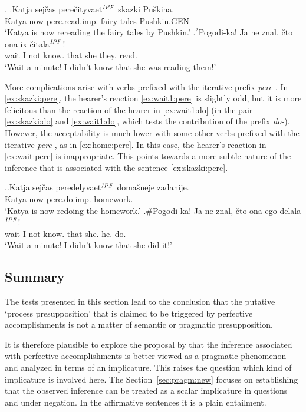 \ex. \label{ex:skazki:pere}\ag.\label{ex:skazki:pere1}Katja sej\v{c}as pere\v{c}ityvaet$^{\mathit{IPF}}$ skazki Pu\v{s}kina.\\
Katya now pere.read.imp. {fairy tales} Pushkin.{\tiny GEN}\\
`Katya is now rereading the fairy tales by Pushkin.'
\bg.$^?$Pogodi-ka! Ja ne znal, \v{c}to ona ix \v{c}itala$^{\mathit{IPF}}$!\label{ex:wait1:pere}\\
wait I not know. that she they. read.\\
`Wait a minute! I didn't know that she was reading them!'

More complications arise with verbs prefixed with the iterative prefix \textit{pere-}. In \ref{ex:skazki:pere}, the hearer's reaction \ref{ex:wait1:pere} is slightly odd, but it is more felicitous than the reaction of the hearer in \ref{ex:wait1:do} (in the pair \ref{ex:skazki:do} and \ref{ex:wait1:do}, which tests the contribution of the prefix \textit{do-}). However, the acceptability is much lower with some other verbs prefixed with the iterative \textit{pere-}, as in \ref{ex:home:pere}. In this case, the hearer's reaction in \ref{ex:wait:pere} is inappropriate. This points towards a more subtle nature of the inference that is associated with the sentence \ref{ex:skazki:pere}.

\ex.\ag.\label{ex:home:pere}Katja sej\v{c}as peredelyvaet$^{\mathit{IPF}}$ {doma\v{s}neje zadanije}.\\
Katya now pere.do.imp. homework.\\
`Katya is now redoing the homework.'
\bg.\#Pogodi-ka! Ja ne znal, \v{c}to ona ego delala$^{\mathit{IPF}}$!\label{ex:wait:pere}\\
wait I not know. that she. he. do.\\
`Wait a minute! I didn't know that she did it!'

\subsection{Summary}
The tests presented in this section lead to the conclusion that the putative `process presupposition' that is claimed to be triggered by perfective accomplishments is not a matter of semantic or pragmatic presupposition.

It is therefore plausible to explore the proposal by \citet{Gronn:04, Gronn:06} that the inference associated with perfective accomplishments is better viewed as a pragmatic phenomenon and analyzed in terms of an implicature.
This raises the question which kind of implicature is involved here. The Section~\ref{sec:pragm:new} focuses on establishing that the observed inference can be treated as a scalar implicature in questions and under negation. In the affirmative sentences it is a plain entailment.


